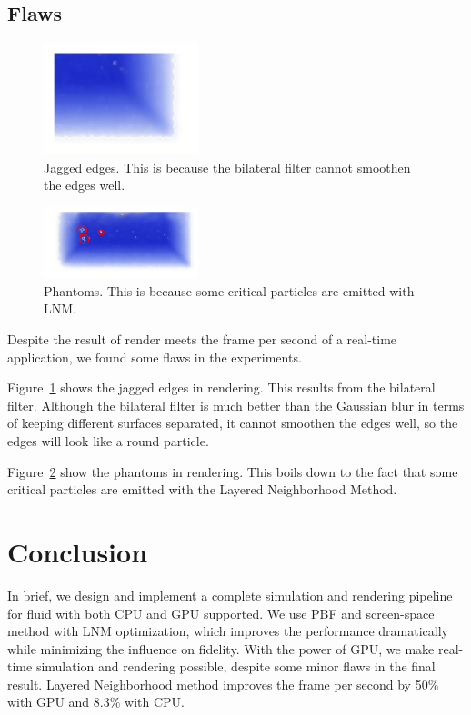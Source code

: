 \documentclass[sigconf]{acmart}
\begin{document}
\subsection{Flaws}

\begin{figure}[htb]
  \centering
  \includegraphics[width=0.4\textwidth]{flaw_1.png}
  \caption{Jagged edges. This is because the bilateral filter cannot smoothen the edges well.}
  \label{jagged-edges}
\end{figure}

\begin{figure}[htb]
  \centering
  \includegraphics[width=0.4\textwidth]{flaw_2.png}
  \caption{Phantoms. This is because some critical particles are emitted with LNM.}
  \label{phantoms}
\end{figure}

Despite the result of render meets the frame per second of a real-time application, we found some flaws in the experiments.

Figure~\ref{jagged-edges} shows the jagged edges in rendering. This results from the bilateral filter. Although the bilateral filter is much better than the Gaussian blur in terms of keeping different surfaces separated, it cannot smoothen the edges well, so the edges will look like a round particle.

Figure~\ref{phantoms} show the phantoms in rendering. This boils down to the fact that some critical particles are emitted with the Layered Neighborhood Method.

\section{Conclusion}

In brief, we design and implement a complete simulation and rendering pipeline for fluid with both CPU and GPU supported. We use PBF and screen-space method with LNM optimization, which improves the performance dramatically while minimizing the influence on fidelity. With the power of GPU, we make real-time simulation and rendering possible, despite some minor flaws in the final result. Layered Neighborhood method improves the frame per second by 50\% with GPU and 8.3\% with CPU.
\end{document}
